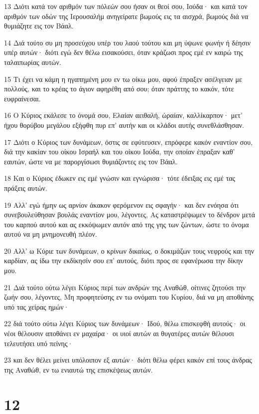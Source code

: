 \par 13 Διότι κατά τον αριθμόν των πόλεών σου ήσαν οι θεοί σου, Ιούδα· και κατά τον αριθμόν των οδών της Ιερουσαλήμ ανηγείρατε βωμούς εις τα αισχρά, βωμούς διά να θυμιάζητε εις τον Βάαλ.
\par 14 Διά τούτο συ μη προσεύχου υπέρ του λαού τούτου και μη ύψωνε φωνήν ή δέησιν υπέρ αυτών· διότι εγώ δεν θέλω εισακούσει, όταν κράζωσι προς εμέ εν καιρώ της ταλαιπωρίας αυτών.
\par 15 Τι έχει να κάμη η ηγαπημένη μου εν τω οίκω μου, αφού έπραξεν ασέλγειαν με πολλούς, και το κρέας το άγιον αφηρέθη από σου; όταν πράττης το κακόν, τότε ευφραίνεσαι.
\par 16 Ο Κύριος εκάλεσε το όνομά σου, Ελαίαν αειθαλή, ώραίαν, καλλίκαρπον· μετ' ήχου θορύβου μεγάλου εξήφθη πυρ επ' αυτήν και οι κλάδοι αυτής συνεθλάσθησαν.
\par 17 Διότι ο Κύριος των δυνάμεων, όστις σε εφύτευσεν, επρόφερε κακόν εναντίον σου, διά την κακίαν του οίκου Ισραήλ και του οίκου Ιούδα, την οποίαν έπραξαν καθ' εαυτών, ώστε να με παροργίσωσι θυμιάζοντες εις τον Βάαλ.
\par 18 Και ο Κύριος έδωκεν εις εμέ γνώσιν και εγνώρισα· τότε έδειξας εις εμέ τας πράξεις αυτών.
\par 19 Αλλ' εγώ ήμην ως αρνίον άκακον φερόμενον εις σφαγήν· και δεν ενόησα ότι συνεβουλεύθησαν βουλάς εναντίον μου, λέγοντες, Ας καταστρέψωμεν το δένδρον μετά του καρπού αυτού και ας εκκόψωμεν αυτόν από της γης των ζώντων, ώστε το όνομα αυτού να μη μνημονευθή πλέον.
\par 20 Αλλ' ω Κύριε των δυνάμεων, ο κρίνων δικαίως, ο δοκιμάζων τους νεφρούς και την καρδίαν, ας ίδω την εκδίκησίν σου επ' αυτούς, διότι προς σε εφανέρωσα την δίκην μου.
\par 21 Διά τούτο ούτω λέγει Κύριος περί των ανδρών της Αναθώθ, οίτινες ζητούσι την ζωήν σου, λέγοντες, Μη προφητεύσης εν τω ονόματι του Κυρίου, διά να μη αποθάνης υπό τας χείρας ημών·
\par 22 διά τούτο ούτω λέγει Κύριος των δυνάμεων· Ιδού, θέλω επισκεφθή αυτούς· οι νέοι θέλουσιν αποθάνει εν μαχαίρα· οι υιοί αυτών αι θυγατέρες αυτών θέλουσι τελευτήσει υπό πείνης·
\par 23 και δεν θέλει μείνει υπόλοιπον εξ αυτών· διότι θέλω φέρει κακόν επί τους άνδρας της Αναθώθ, εν τω ενιαυτώ της επισκέψεως αυτών.

\chapter{12}

